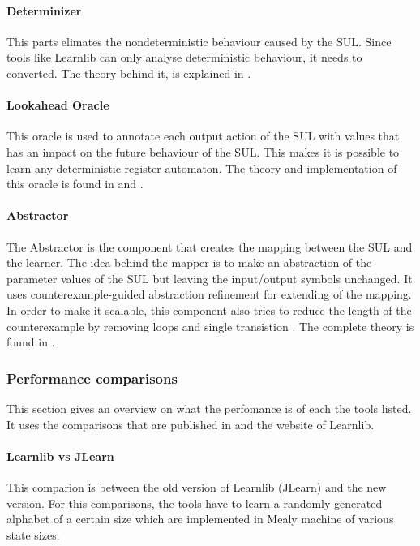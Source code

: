 \documentclass[multi,crop=false,class=article]{standalone}
\begin{document}
\paragraph{Determinizer}
This parts elimates the nondeterministic behaviour caused by the SUL. Since
tools like Learnlib can only analyse deterministic behaviour, it needs to
converted. The theory behind it, is explained in \cite{Aarts2015}.

\paragraph{Lookahead Oracle}
This oracle is used to annotate each output action of the SUL with values that
has an impact on the future behaviour of the SUL. This makes it is possible to
learn any deterministic register automaton. The theory and implementation of
this oracle is found in \cite{Aarts2014} and \cite{tomte14}.

\paragraph{Abstractor}
The Abstractor is the component that creates the mapping between the SUL and
the learner. The idea behind the mapper is to make an abstraction of the
parameter values of the SUL but leaving the input/output symbols unchanged. It
uses counterexample-guided abstraction refinement\cite{tomte14} for extending
of the mapping. In order to make it scalable, this component also tries to
reduce the length of the counterexample by removing loops and single
transistion \cite{Koopman2014}. The complete theory is found in \cite{tomte14}.

\subsubsection{Performance comparisons}
\label{ssec:performance_compare}
This section gives an overview on what the perfomance is of each the tools
listed. It uses the comparisons that are published in
\cite{Aarts2014}\cite{Aarts2015} and
the website of
Learnlib.

\paragraph{Learnlib vs JLearn}

\todo{Image of comparison between Learnlib and JLearn] }
This comparion is between the old version of Learnlib (JLearn) and the new
version. For this comparisons, the tools have to learn a randomly generated
alphabet of a certain size which are implemented in Mealy machine of various
state sizes.
\end{document}
